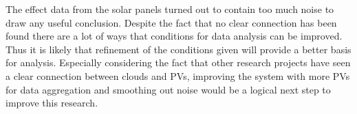 The effect data from the solar panels turned out to contain too much
noise to draw any useful conclusion.  Despite the fact that no clear
connection has been found there are a lot of ways that conditions for
data analysis can be improved.  Thus it is likely that refinement of
the conditions given will provide a better basis for analysis.
Especially considering the fact that other research projects
\citep{southafrica,cloudTrack} have seen a clear connection between
clouds and PVs, improving the system with more PVs for data
aggregation and smoothing out noise would be a logical next step to
improve this research.

